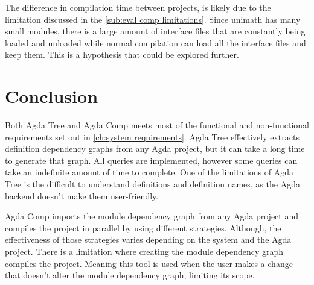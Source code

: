 The difference in compilation time between projects, is likely due to the
limitation discussed in the \cref{sub:eval comp limitations}. Since unimath has
many small modules, there is a large amount of interface files that are
constantly being loaded and unloaded while normal compilation can load all the
interface files and keep them. This is a hypothesis that could be explored
further.

\section{Conclusion}

Both Agda Tree and Agda Comp meets most of the functional and non-functional
requirements set out in \cref{ch:system requirements}. Agda Tree effectively
extracts definition dependency graphs from any Agda project, but it can take a
long time to generate that graph. All queries are implemented, however some
queries can take an indefinite amount of time to complete. One of the
limitations of Agda Tree is the difficult to understand definitions and
definition names, as the Agda backend doesn't make them user-friendly.

Agda Comp imports the module dependency graph from any Agda project and
compiles the project in parallel by using different strategies. Although, the
effectiveness of those strategies varies depending on the system and the Agda
project. There is a limitation where creating the module dependency graph
compiles the project. Meaning this tool is used when the user makes a change
that doesn't alter the module dependency graph, limiting its scope.





